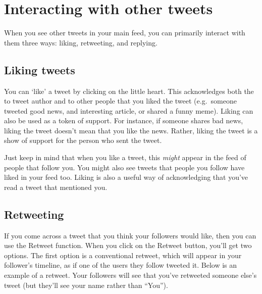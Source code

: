 \documentclass[]{book}
\begin{document}
\hypertarget{interacting-with-other-tweets}{%
\section{Interacting with other tweets}\label{interacting-with-other-tweets}}

When you see other tweets in your main feed, you can primarily interact with them three ways: liking, retweeting, and replying.

\hypertarget{liking-tweets}{%
\subsection{Liking tweets}\label{liking-tweets}}

You can `like' a tweet by clicking on the little heart. This acknowledges both the to tweet author and to other people that you liked the tweet (e.g.~someone tweeted good news, and interesting article, or shared a funny meme). Liking can also be used as a token of support. For instance, if someone shares bad news, liking the tweet doesn't mean that you like the news. Rather, liking the tweet is a show of support for the person who sent the tweet.

Just keep in mind that when you like a tweet, this \emph{might} appear in the feed of people that follow you. You might also see tweets that people you follow have liked in your feed too. Liking is also a useful way of acknowledging that you've read a tweet that mentioned you.

\hypertarget{retweeting}{%
\subsection{Retweeting}\label{retweeting}}

If you come across a tweet that you think your followers would like, then you can use the Retweet function. When you click on the Retweet button, you'll get two options. The first option is a conventional retweet, which will appear in your follower's timeline, as if one of the users they follow tweeted it. Below is an example of a retweet. Your followers will see that you've retweeted someone else's tweet (but they'll see your name rather than ``You'').
\end{document}
